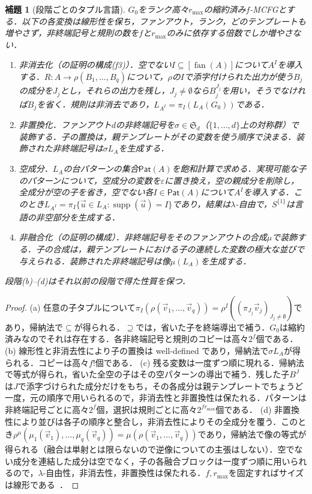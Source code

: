 \documentclass[11pt,a4paper]{ltjsarticle}
\numberwithin{equation}{section}
\theoremstyle{plain}
\newtheorem{lemma}[theorem]{補題}
\theoremstyle{definition}
\theoremstyle{remark}
\newcommand{\tuple}[1]{\vec{#1}}
\newcommand{\eps}{\varepsilon}
\newcommand{\fan}{\operatorname{fan}}
\begin{document}
\begin{lemma}[段階ごとのタプル言語]
\label{lem:normalization-stages}
$G_0$をランク高々$r_{\max}$の縮約済み$f$-MCFGとする．以下の各変換は線形性を保ち，ファンアウト，ランク，どのテンプレートも増やさず，非終端記号と規則の数を$f$と$r_{\max}$のみに依存する倍数でしか増やさない．
\begin{enumerate}[label=\textup{(\alph*)},leftmargin=*]
\item \emph{非消去化}（\cite[Lemma~2.2]{SekiEtAl1991}の証明の構成(f3)）．空でない$I\subseteq[\fan(A)]$について$A^I$を導入する．$R:A\to\rho(B_1,\ldots,B_q)$について，$\rho$の$I$で添字付けられた出力が使う$B_j$の成分を$J_j$とし，それらの出力を残し，$J_j\ne\emptyset$なら$B_j^{J_j}$を用い，そうでなければ$B_j$を省く．規則は非消去であり，$L_{A^I}=\pi_I(L_A(G_0))$である．
\item \emph{非置換化}．ファンアウト$d$の非終端記号を$\sigma\in\mathfrak S_d$（$\{1,\ldots,d\}$上の対称群）で装飾する．子の置換は，親テンプレートがその変数を使う順序で決まる．装飾された非終端記号は$\sigma L_A$を生成する．
\item \emph{空成分}．$L_A$の台パターンの集合$\mathsf{Pat}(A)$を飽和計算で求める．実現可能な子のパターンについて，空成分の変数を$\eps$に置き換え，空の親成分を削除し，全成分が空の子を省き，空でない各$I\in\mathsf{Pat}(A)$について$A^I$を導入する．このとき$L_{A^I}=\pi_I\{\tuple u\in L_A:\operatorname{supp}(\tuple u)=I\}$であり，結果は$\lambda$-自由で，$S^{\{1\}}$は言語の非空部分を生成する．
\item \emph{非融合化}（\cite[Section~2.3, Lemma~1]{Yoshinaka2011}の証明の構成）．非終端記号をそのファンアウトの合成$\mu$で装飾する．子の合成は，親テンプレートにおける子の連続した変数の極大な並びで与えられる．装飾された非終端記号は像$\mu(L_A)$を生成する．
\end{enumerate}
段階(b)--(d)はそれ以前の段階で得た性質を保つ．
\end{lemma}

\begin{proof}
(a) 任意の子タプルについて$\pi_I(\rho(\tuple v_1,\ldots,\tuple v_q))=\rho^I((\pi_{J_j}\tuple v_j)_{J_j\ne\emptyset})$であり，帰納法で$\subseteq$が得られる．$\supseteq$では，省いた子を終端導出で補う．$G_0$は縮約済みなのでそれは存在する．各非終端記号と規則のコピーは高々$2^f$個である．
(b) 線形性と非消去性により子の置換は well-defined であり，帰納法で$\sigma L_A$が得られる．コピーは高々$f!$個である．
(c) 残る変数は一度ずつ順に現れる．帰納法で等式が得られ，省いた全空の子はその空パターンの導出で補う．残した子$B^J$は$J$で添字づけられた成分だけをもち，その各成分は親テンプレートでちょうど一度，元の順序で用いられるので，非消去性と非置換性は保たれる．パターンは非終端記号ごとに高々$2^f$個，選択は規則ごとに高々$2^{fr_{\max}}$個である．
(d) 非置換性により並びは各子の順序と整合し，非消去性によりその全成分を覆う．このとき$\rho^\mu(\mu_1(\tuple v_1),\ldots,\mu_q(\tuple v_q))=\mu(\rho(\tuple v_1,\ldots,\tuple v_q))$であり，帰納法で像の等式が得られる（融合は単射とは限らないので逆像についての主張はしない）．空でない成分を連結した成分は空でなく，子の各融合ブロックは一度ずつ順に用いられるので，$\lambda$-自由性，非消去性，非置換性は保たれる．$f,r_{\max}$を固定すればサイズは線形である~\cite[Section~2.3, after Example~2]{Yoshinaka2011}．
\end{proof}
\end{document}
